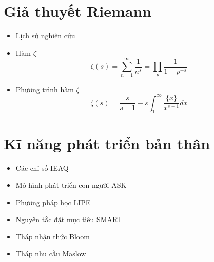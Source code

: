\documentclass[aspectratio=43]{beamer}
\begin{document}
\begin{frame}{\secname}
	
\end{frame}

\section{Giả thuyết Riemann}
\begin{frame}{\secname}
	\begin{itemize}
		\item Lịch sử nghiên cứu
		\item Hàm $\zeta$
			\begin{equation*}
				\zeta(s)=\sum_{n=1}^\infty \frac{1}{n^s} = \prod_p \frac{1}{1-p^{-s}}
			\end{equation*}
		\item Phương trình hàm $\zeta$
			\begin{equation*}
				\zeta(s) = \frac{s}{s-1}- s \int_{1}^{\infty} \frac{\{x\}}{x^{s+1}}dx
			\end{equation*}
	\end{itemize}	
\end{frame}

\section{Kĩ năng phát triển bản thân}
\begin{frame}{\secname}
	\begin{itemize}
		\item Các chỉ số IEAQ
		\item Mô hình phát triển con người ASK
		\item Phương pháp học LIPE
		\item Nguyên tắc đặt mục tiêu SMART
		\item Tháp nhận thức Bloom
		\item Tháp nhu cầu Maslow
	\end{itemize}	
\end{frame}
\end{document}
